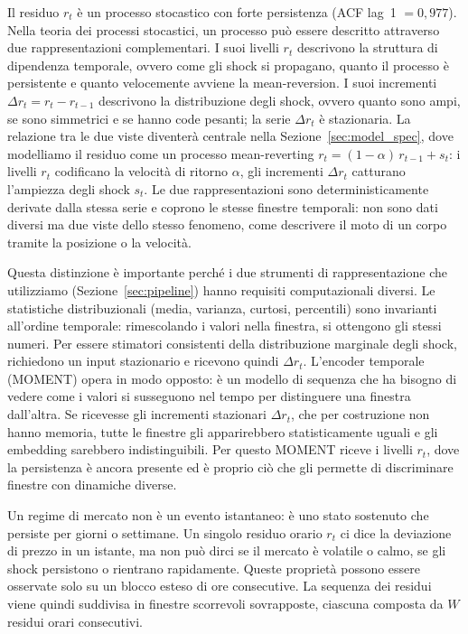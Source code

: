 \documentclass[12pt]{article}
\begin{document}
Il residuo $r_t$ è un processo stocastico con forte persistenza (ACF lag~1 $= 0{,}977$).
Nella teoria dei processi stocastici, un processo può essere descritto attraverso due rappresentazioni complementari.
I suoi livelli $r_t$ descrivono la struttura di dipendenza temporale, ovvero come gli shock si propagano, quanto il processo è persistente e quanto velocemente avviene la mean-reversion.
I suoi incrementi $\Delta r_t = r_t - r_{t-1}$ descrivono la distribuzione degli shock, ovvero quanto sono ampi, se sono simmetrici e se hanno code pesanti; la serie $\Delta r_t$ è stazionaria.
La relazione tra le due viste diventerà centrale nella Sezione~\ref{sec:model_spec}, dove modelliamo il residuo come un processo mean-reverting $r_t = (1-\alpha)\,r_{t-1} + s_t$: i livelli $r_t$ codificano la velocità di ritorno $\alpha$, gli incrementi $\Delta r_t$ catturano l'ampiezza degli shock $s_t$.
Le due rappresentazioni sono deterministicamente derivate dalla stessa serie e coprono le stesse finestre temporali: non sono dati diversi ma due viste dello stesso fenomeno, come descrivere il moto di un corpo tramite la posizione o la velocità.

Questa distinzione è importante perché i due strumenti di rappresentazione che utilizziamo (Sezione~\ref{sec:pipeline}) hanno requisiti computazionali diversi.
Le statistiche distribuzionali (media, varianza, curtosi, percentili) sono invarianti all'ordine temporale: rimescolando i valori nella finestra, si ottengono gli stessi numeri.
Per essere stimatori consistenti della distribuzione marginale degli shock, richiedono un input stazionario e ricevono quindi $\Delta r_t$.
L'encoder temporale (MOMENT) opera in modo opposto: è un modello di sequenza che ha bisogno di vedere come i valori si susseguono nel tempo per distinguere una finestra dall'altra.
Se ricevesse gli incrementi stazionari $\Delta r_t$, che per costruzione non hanno memoria, tutte le finestre gli apparirebbero statisticamente uguali e gli embedding sarebbero indistinguibili.
Per questo MOMENT riceve i livelli $r_t$, dove la persistenza è ancora presente ed è proprio ciò che gli permette di discriminare finestre con dinamiche diverse.

Un regime di mercato non è un evento istantaneo: è uno stato sostenuto che persiste per giorni o settimane.
Un singolo residuo orario $r_t$ ci dice la deviazione di prezzo in un istante, ma non può dirci se il mercato è volatile o calmo, se gli shock persistono o rientrano rapidamente.
Queste proprietà possono essere osservate solo su un blocco esteso di ore consecutive.
La sequenza dei residui viene quindi suddivisa in finestre scorrevoli sovrapposte, ciascuna composta da $W$ residui orari consecutivi.
\end{document}
